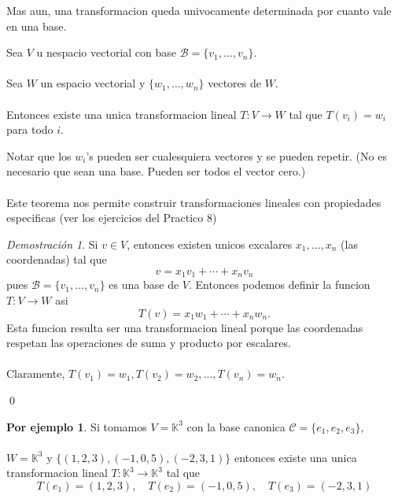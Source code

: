 \documentclass{article}
\theoremstyle{definition}
\theoremstyle{definition}
\newtheorem*{ej}{Por ejemplo}
\theoremstyle{remark}
\newtheorem*{demo}{Demostración}
\begin{document}
Mas aun, una transformacion queda univocamente determinada por cuanto vale en una base. \begin{teo}
 Sea $V$ u nespacio vectorial con base $\mathcal{B}=\{v_1, \dots ,v_n \}$. \\\\ Sea $W$ un espacio vectorial y $\{w_1, \dots ,w_n\}$ vectores de $W$. \\\\ Entonces existe una unica transformacion lineal $T : V \to W$ tal que $T (v_i) = w_i$ para todo $i$.
\end{teo}
Notar que los $w_i$'s pueden ser cualesquiera vectores y se pueden repetir. (No es necesario que sean una base. Pueden ser todos el vector cero.)\\\\ Este teorema nos permite construir transformaciones lineales con propiedades especificas (ver los ejercicios del Practico 8) 
\begin{demo}
  Si $ v \in V$, entonces existen unicos excalares $x_1, \dots ,x_n$ (las coordenadas) tal que \[
v=x_1v_1 + \cdots + x_n v_n 
  \]
  pues $\mathcal{B}=\{v_1,\dots ,v_n\}$ es una base de $V$. Entonces podemos definir la funcion $T : V \to W$ asi \[
T(v)=x_1w_1 + \cdots + x_n w_n.
  \]
  Esta funcion resulta ser una transformacion lineal porque las coordenadas respetan las operaciones de suma y producto por escalares.  \\\\ Claramente, $T(v_1)=w_1, T(v_2)=w_2, \dots , T(v_n)=w_n$.
\end{demo}
\qed
\begin{ej}
  Si tomamos $V = \mathbb{K}^3$ con la base canonica $\mathcal{C}=\{e_1, e_2, e_3\}$, \\\\ $W=\mathbb{K}^3$ y $\{(1,2,3),(-1,0,5),(-2,3,1)\}$ entonces existe una unica transformacion lineal $T : \mathbb{K}^3 \to \mathbb{K}^3$ tal que \[
T(e_1)=(1,2,3), \quad T(e_2) =(-1,0,5), \quad T(e_3) = (-2,3,1)
  \]
\end{ej}
\end{document}
